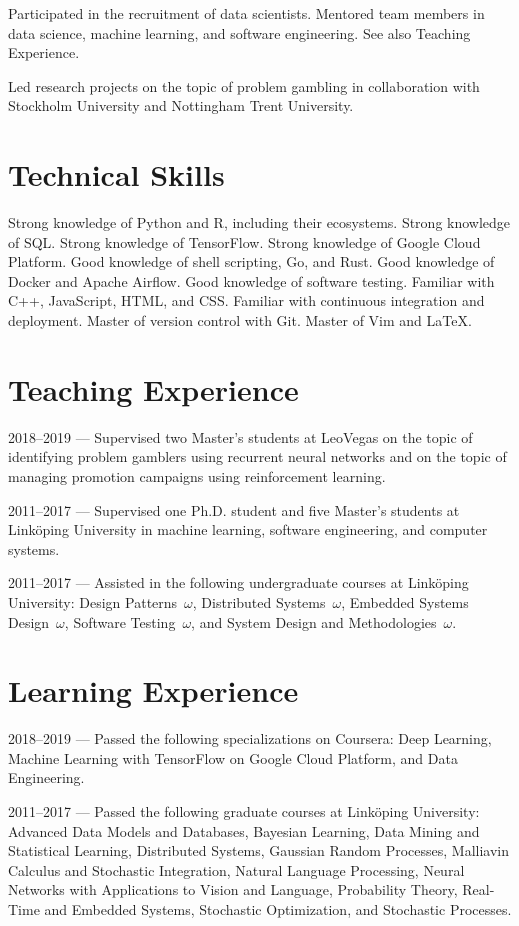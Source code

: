 \documentclass{article}
\begin{document}
Participated in the recruitment of data scientists. Mentored team members in
data science, machine learning, and software engineering. See also Teaching
Experience.

Led research projects on the topic of problem gambling in collaboration with
Stockholm University and Nottingham Trent University.

\section{Technical Skills}
Strong knowledge of Python and R, including their ecosystems. Strong knowledge
of SQL. Strong knowledge of TensorFlow. Strong knowledge of Google Cloud
Platform. Good knowledge of shell scripting, Go, and Rust. Good knowledge of
Docker and Apache Airflow. Good knowledge of software testing. Familiar with
C++, JavaScript, HTML, and CSS. Familiar with continuous integration and
deployment. Master of version control with Git. Master of Vim and LaTeX.

\section{Teaching Experience}
2018--2019 --- Supervised two Master's students at LeoVegas on the topic of
identifying problem gamblers using recurrent neural networks and on the topic
of managing promotion campaigns using reinforcement learning.

2011--2017 --- Supervised one Ph.D. student and five Master's students at
Linköping University in machine learning, software engineering, and computer
systems.

2011--2017 --- Assisted in the following undergraduate courses at Linköping
University: Design Patterns~$\omega$, Distributed Systems~$\omega$, Embedded
Systems Design~$\omega$, Software Testing~$\omega$, and System Design and
Methodologies~$\omega$.

\section{Learning Experience}
2018--2019 --- Passed the following specializations on Coursera: Deep Learning,
Machine Learning with TensorFlow on Google Cloud Platform, and Data Engineering.

2011--2017 --- Passed the following graduate courses at Linköping University:
Advanced Data Models and Databases, Bayesian Learning, Data Mining and
Statistical Learning, Distributed Systems, Gaussian Random Processes, Malliavin
Calculus and Stochastic Integration, Natural Language Processing, Neural
Networks with Applications to Vision and Language, Probability Theory, Real-Time
and Embedded Systems, Stochastic Optimization, and Stochastic Processes.
\end{document}
